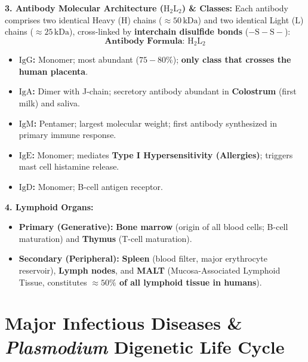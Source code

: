 \documentclass[10pt,twoside,openright]{book}
\begin{document}
\begin{conceptbox}
\textbf{3. Antibody Molecular Architecture ($\mathrm{H_2L_2}$) \& Classes:}
Each antibody comprises two identical Heavy ($\mathrm{H}$) chains ($\approx 50\,\mathrm{kDa}$) and two identical Light ($\mathrm{L}$) chains ($\approx 25\,\mathrm{kDa}$), cross-linked by \textbf{interchain disulfide bonds} ($\mathrm{-S-S-}$):
\begin{equation}
  \mathbf{\text{Antibody Formula: } \mathrm{H_2 L_2}}
\end{equation}
\begin{itemize}
  \item \textbf{$\mathbf{\mathrm{IgG}}$:} Monomer; most abundant ($75-80\%$); \textbf{only class that crosses the human placenta}.
  \item \textbf{$\mathbf{\mathrm{IgA}}$:} Dimer with J-chain; secretory antibody abundant in \textbf{Colostrum} (first milk) and saliva.
  \item \textbf{$\mathbf{\mathrm{IgM}}$:} Pentamer; largest molecular weight; first antibody synthesized in primary immune response.
  \item \textbf{$\mathbf{\mathrm{IgE}}$:} Monomer; mediates \textbf{Type I Hypersensitivity (Allergies)}; triggers mast cell histamine release.
  \item \textbf{$\mathbf{\mathrm{IgD}}$:} Monomer; B-cell antigen receptor.
\end{itemize}

\textbf{4. Lymphoid Organs:}
\begin{itemize}
  \item \textbf{Primary (Generative):} \textbf{Bone marrow} (origin of all blood cells; B-cell maturation) and \textbf{Thymus} (T-cell maturation).
  \item \textbf{Secondary (Peripheral):} \textbf{Spleen} (blood filter, major erythrocyte reservoir), \textbf{Lymph nodes}, and \textbf{MALT} (Mucosa-Associated Lymphoid Tissue, constitutes \textbf{$\approx 50\%$ of all lymphoid tissue in humans}).
\end{itemize}
\end{conceptbox}

\section{Major Infectious Diseases \& \textit{Plasmodium} Digenetic Life Cycle}
\end{document}
